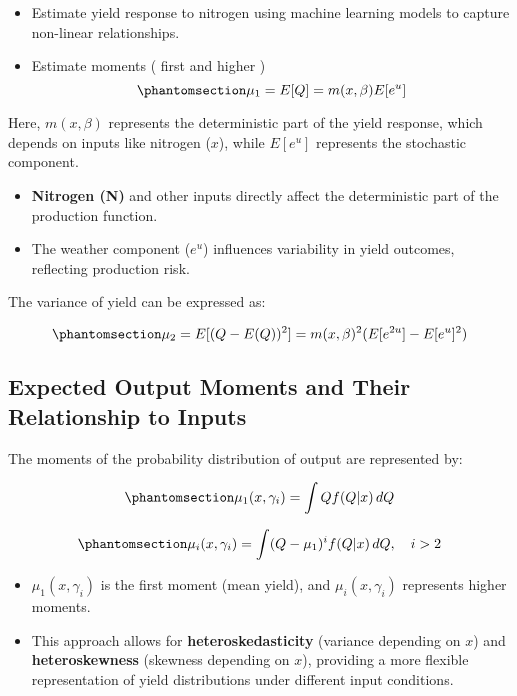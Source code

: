 \documentclass[
  letterpaper,
  DIV=11,
  numbers=noendperiod]{scrartcl}
\providecommand{\tightlist}{%
  \setlength{\itemsep}{0pt}\setlength{\parskip}{0pt}}\usepackage{longtable,booktabs,array}
\begin{document}
\begin{itemize}
\item
  Estimate yield response to nitrogen using machine learning models to
  capture non-linear relationships.
\item
  Estimate moments ( first and higher )
  \begin{equation}\phantomsection\label{eq-mean-yield}{
  \mu_1 = E[Q] = m(x,\beta) E[e^u]
  }\end{equation}
\end{itemize}

Here, \(m(x,\beta)\) represents the deterministic part of the yield
response, which depends on inputs like nitrogen (\(x\)), while
\(E[e^u]\) represents the stochastic component.

\begin{itemize}
\tightlist
\item
  \textbf{Nitrogen (N)} and other inputs directly affect the
  deterministic part of the production function.
\item
  The weather component (\(e^u\)) influences variability in yield
  outcomes, reflecting production risk.
\end{itemize}

The variance of yield can be expressed as:

\begin{equation}\phantomsection\label{eq-variance-yield}{
\mu_2 = E[(Q - E(Q))^2] = m(x,\beta)^2 (E[e^{2u}] - E[e^u]^2)
}\end{equation}

\subsection{Expected Output Moments and Their Relationship to
Inputs}\label{expected-output-moments-and-their-relationship-to-inputs}

The moments of the probability distribution of output are represented
by:

\begin{equation}\phantomsection\label{eq-moment1}{
\mu_1(x, \gamma_i) = \int Q f(Q|x) \, dQ
}\end{equation}

\begin{equation}\phantomsection\label{eq-momenti}{
\mu_i(x, \gamma_i) = \int (Q - \mu_1)^i f(Q|x) \, dQ, \quad i > 2
}\end{equation}

\begin{itemize}
\tightlist
\item
  \(\mu_1(x, \gamma_i)\) is the first moment (mean yield), and
  \(\mu_i(x, \gamma_i)\) represents higher moments.
\item
  This approach allows for \textbf{heteroskedasticity} (variance
  depending on \(x\)) and \textbf{heteroskewness} (skewness depending on
  \(x\)), providing a more flexible representation of yield
  distributions under different input conditions.
\end{itemize}
\end{document}
